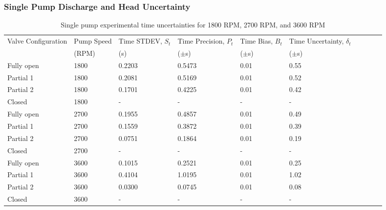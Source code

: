 \subsubsection{Single Pump Discharge and Head Uncertainty}
\begin{table}[H]
    \centering
    \caption{Single pump experimental time uncertainties for 1800 RPM, 2700 RPM, and 3600 RPM}
    \label{tab:single_pump_time_uncertainty}
    \begin{tabular}{lC{0.15\textwidth}C{0.10\textwidth}C{0.12\textwidth}C{0.08\textwidth}C{0.10\textwidth}C{0.10\textwidth}C{0.10\textwidth}C{0.15\textwidth}C{0.10\textwidth}}
        \toprule
        Valve Configuration & Pump Speed & Time STDEV, $S_{t}$ & Time Precision, $P_t$ & Time Bias, $B_t$ & Time Uncertainty, $\delta_t$ \\
        & (RPM) & (s) & ($\pm$s) & ($\pm$s) & ($\pm$s) \\
        \midrule
        Fully open & 1800 & 0.2203 & 0.5473 & 0.01 & 0.55 \\
        Partial 1 & 1800 & 0.2081 & 0.5169 & 0.01 & 0.52 \\
        Partial 2 & 1800 & 0.1701 & 0.4225 & 0.01 & 0.42 \\
        Closed & 1800 & - & - & - & - \\
        Fully open & 2700 & 0.1955 & 0.4857 & 0.01 & 0.49 \\
        Partial 1 & 2700 & 0.1559 & 0.3872 & 0.01 & 0.39 \\
        Partial 2 & 2700 & 0.0751 & 0.1864 & 0.01 & 0.19 \\
        Closed & 2700 & - & - & - & - \\
        Fully open & 3600 & 0.1015 & 0.2521 & 0.01 & 0.25 \\
        Partial 1 & 3600 & 0.4104 & 1.0195 & 0.01 & 1.02 \\
        Partial 2 & 3600 & 0.0300 & 0.0745 & 0.01 & 0.08 \\
        Closed & 3600 & - & - & - & - \\
        \bottomrule
    \end{tabular}
\end{table}
